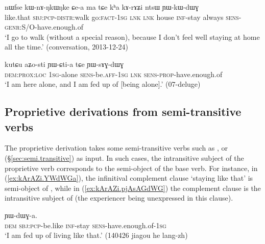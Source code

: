 \begin{exe}
\ex \label{ex:kArAZi.YWkWdWG}
\gll nɯfse kɯ-nɤ-ŋkɯ\redp{}ŋke ɕe-a ma tɕe kʰa kɤ-rɤʑi ntsɯ ɲɯ-kɯ-dɯɣ \\
like.that \textsc{sbj}:\textsc{pcp}-\textsc{distr}:walk go:\textsc{fact}-\textsc{1sg} \textsc{lnk} \textsc{lnk} house \textsc{inf}-stay always \textsc{sens}-\textsc{genr}:S/O-have.enough.of \\
\glt `I go to walk (without a special reason), because I don't feel well staying at home all the time.' (conversation, 2013-12-24)
\end{exe}

\begin{exe}
\ex \label{ex:aZosti.YWsAGdWG}
\gll kutɕu aʑo-sti ɲɯ-ɕti-a tɕe ɲɯ-sɤɣ-dɯɣ \\
\textsc{dem}:\textsc{prox}:\textsc{loc} \textsc{1sg}-alone \textsc{sens}-be.\textsc{aff}-\textsc{1sg} \textsc{lnk} \textsc{sens}-\textsc{prop}-have.enough.of \\
\glt `I am here alone, and I am fed up of [being alone].' (07-deluge) 
\end{exe}

\subsection{Proprietive derivations from semi-transitive verbs} \label{sec:proprietive.semi.tr}
The proprietive derivation takes some semi-transitive verbs such as ,  or  (§\ref{sec:semi.transitive}) as input. In such cases, the intransitive subject of the proprietive verb corresponds to the semi-object of the base verb. For instance, in (\ref{ex:kArAZi.YWdWGa}), the infinitival complement clause  `staying like that' is semi-object of , while in (\ref{ex:kArAZi.pjAsAGdWG}) the complement clause is the intransitive subject of  (the experiencer being unexpressed in this clause).

\begin{exe}
\ex \label{ex:kArAZi.YWdWGa}
 ɲɯ-dɯɣ-a. \\
\textsc{dem} \textsc{sbj}:\textsc{pcp}-be.like \textsc{inf}-stay \textsc{sens}-have.enough.of-\textsc{1sg} \\
\glt `I am fed up of living like that.' (140426 jiagou he lang-zh) 
\end{exe}

